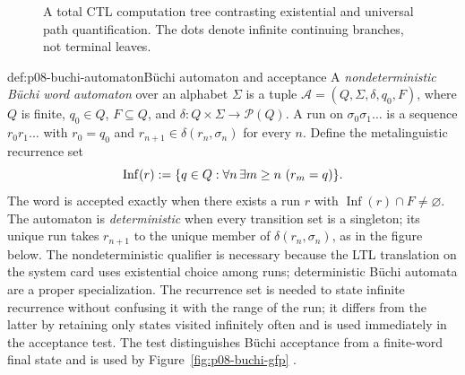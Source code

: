\begin{figure}[!htbp]
\centering
{}
\caption{A total CTL computation tree contrasting existential and universal
path quantification.  The dots denote infinite continuing
branches, not terminal leaves.}
\label{fig:p08-ctl-tree}
\end{figure}

\begin{hbdefinition}{def:p08-buchi-automaton}{B\"uchi automaton and acceptance}
A \emph{nondeterministic B\"uchi word automaton} over an alphabet \(\Sigma\)
is a tuple
\(\mathcal A=(Q,\Sigma,\delta,q_0,F)\), where \(Q\) is finite,
\(q_0\in Q\), \(F\subseteq Q\), and
\(\delta:Q\times\Sigma\to\mathcal P(Q)\).  A run on
\(\sigma_0\sigma_1\ldots\) is a sequence \(r_0r_1\ldots\) with
\(r_0=q_0\) and \(r_{n+1}\in\delta(r_n,\sigma_n)\) for every \(n\).
Define the metalinguistic recurrence set
\[
 \operatorname{Inf}(r)\mathrel{:=}
 \{q\in Q:\forall n\,\exists m\ge n\ (r_m=q)\}.
\]
The word is accepted exactly when there exists a run \(r\) with
\(\operatorname{Inf}(r)\cap F\ne\varnothing\).  The automaton is
\emph{deterministic} when every transition set is a singleton; its unique run
takes \(r_{n+1}\) to the unique member of
\(\delta(r_n,\sigma_n)\), as in the figure below.
The nondeterministic qualifier is necessary because the LTL translation on the
system card uses existential choice among runs; deterministic B\"uchi
automata are a proper specialization.  The recurrence set is needed to
state infinite recurrence without confusing it with the range of the run; it
differs from the latter by retaining only states visited infinitely often and
is used immediately in the acceptance test.  The test distinguishes B\"uchi
acceptance from a finite-word final state and is used by
Figure~\ref{fig:p08-buchi-gfp}
\cite{Buchi1962,VardiWolper1986}.
\end{hbdefinition}

